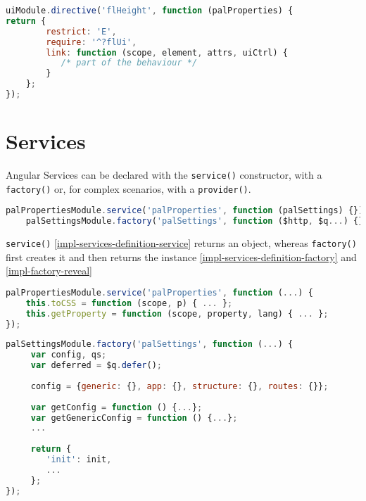\begin{lstlisting}[language=JavaScript,caption=flHeight Directive, label=impl-directive-height-example]
uiModule.directive('flHeight', function (palProperties) {
return {
        restrict: 'E',
        require: '^?flUi',
        link: function (scope, element, attrs, uiCtrl) {
           /* part of the behaviour */
        }
    };
});
\end{lstlisting}


\section{Services}
Angular Services can be declared with the \texttt{service()} constructor, with a \texttt{factory()} or, for complex scenarios, with a \texttt{provider()}.

\begin{lstlisting}[language=JavaScript,caption=Examples of services definition, label=impl-services-definition]
    palPropertiesModule.service('palProperties', function (palSettings) {});
    palSettingsModule.factory('palSettings', function ($http, $q...) {});
\end{lstlisting}




\texttt{service()} \ref{impl-services-definition-service} returns an object, whereas \texttt{factory()} first creates it and then returns the instance \ref{impl-services-definition-factory} and \ref{impl-factory-reveal}

\begin{lstlisting}[language=JavaScript,caption=Examples of services definition (service()), label=impl-services-definition-service]
palPropertiesModule.service('palProperties', function (...) {
    this.toCSS = function (scope, p) { ... };
    this.getProperty = function (scope, property, lang) { ... };
});
\end{lstlisting}

\begin{lstlisting}[language=JavaScript,caption=Examples of services definition (factory()), label=impl-services-definition-factory]
palSettingsModule.factory('palSettings', function (...) {
     var config, qs;
     var deferred = $q.defer();
     
     config = {generic: {}, app: {}, structure: {}, routes: {}};
     
     var getConfig = function () {...};
     var getGenericConfig = function () {...};
     ...
     
     return {
        'init': init,
        ...
     };
});
\end{lstlisting}

